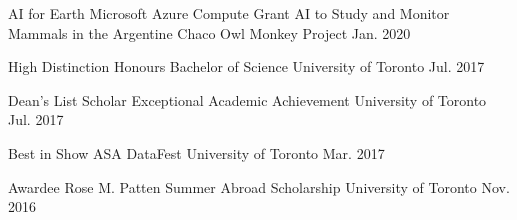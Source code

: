 



\begin{cvhonors}

  \cvhonor
    {AI for Earth Microsoft Azure Compute Grant} %
    {AI to Study and Monitor Mammals in the Argentine Chaco} %
    {Owl Monkey Project} %
    {Jan. 2020} %

  \cvhonor
    {High Distinction} %
    {Honours Bachelor of Science} %
    {University of Toronto} %
    {Jul. 2017} %

  \cvhonor
    {Dean's List Scholar} %
    {Exceptional Academic Achievement} %
    {University of Toronto} %
    {Jul. 2017} %

  \cvhonor
    {Best in Show} %
    {ASA DataFest} %
    {University of Toronto} %
    {Mar. 2017} %

  \cvhonor
    {Awardee} %
    {Rose M. Patten Summer Abroad Scholarship} %
    {University of Toronto} %
    {Nov. 2016} %

\end{cvhonors}
